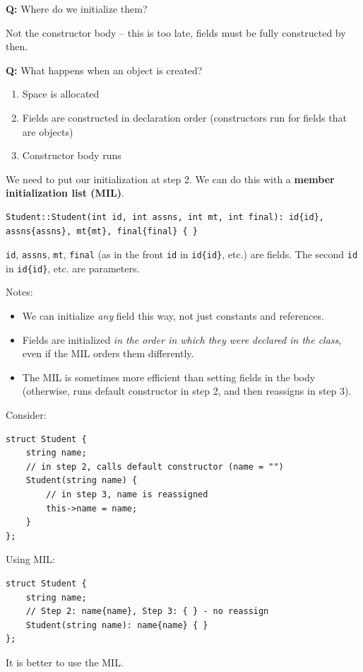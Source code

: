\documentclass[11pt]{article}
\theoremstyle{definition}
\begin{document}
{\bf Q:} Where do we initialize them?

Not the constructor body -- this is too late, fields must be fully constructed by then.

{\bf Q:} What happens when an object is created? \vspace{-0.25cm}
\begin{enumerate}
    \item Space is allocated
    \item Fields are constructed in declaration order (constructors run for fields that are objects)
    \item Constructor body runs
\end{enumerate}

We need to put our initialization at step 2. We can do this with a {\bf member initialization list (MIL)}.
\begin{lstlisting}
Student::Student(int id, int assns, int mt, int final): id{id}, assns{assns}, mt{mt}, final{final} { }
\end{lstlisting}
{\tt id}, {\tt assns}, {\tt mt}, {\tt final} (as in the front {\tt id} in {\tt id\{id\}}, etc.) are fields. The second {\tt id} in {\tt id\{id\}}, etc. are parameters.

Notes: \vspace{-0.25cm}
\begin{itemize}
\item We can initialize {\it any} field this way, not just constants and references. 
\item Fields are initialized {\it in the order in which they were declared in the class}, even if the MIL orders them differently.
\item The MIL is sometimes more efficient than setting fields in the body (otherwise, runs default constructor in step 2, and then reassigns in step 3).
\end{itemize}

Consider:
\begin{lstlisting}
struct Student {
    string name;
    // in step 2, calls default constructor (name = "")
    Student(string name) {
        // in step 3, name is reassigned
        this->name = name;
    }
};
\end{lstlisting}
Using MIL:
\begin{lstlisting}
struct Student {
    string name;
    // Step 2: name{name}, Step 3: { } - no reassign
    Student(string name): name{name} { }
};
\end{lstlisting}
It is better to use the MIL.
\end{document}
